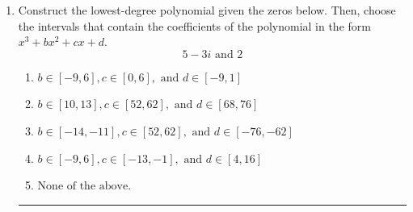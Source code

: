 \documentclass[14pt]{extbook}
\newcommand{\litem}[1]{\item#1\hspace*{-1cm}\rule{\textwidth}{0.4pt}}
\begin{document}
\begin{enumerate}
{\begin{enumerate}[label=\Alph*.]
\end{enumerate} }
\litem{
Construct the lowest-degree polynomial given the zeros below. Then, choose the intervals that contain the coefficients of the polynomial in the form $x^3+bx^2+cx+d$.\[ 5 - 3 i \text{ and } 2 \]\begin{enumerate}[label=\Alph*.]
\item \( b \in [-9, 6], c \in [0, 6], \text{ and } d \in [-9, 1] \)
\item \( b \in [10, 13], c \in [52, 62], \text{ and } d \in [68, 76] \)
\item \( b \in [-14, -11], c \in [52, 62], \text{ and } d \in [-76, -62] \)
\item \( b \in [-9, 6], c \in [-13, -1], \text{ and } d \in [4, 16] \)
\item \( \text{None of the above.} \)


\end{enumerate}}
\end{enumerate}
\end{document}
